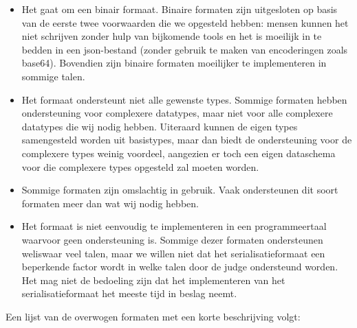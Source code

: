 \begin{itemize}
    \item Het gaat om een binair formaat.
    Binaire formaten zijn uitgesloten op basis van de eerste twee voorwaarden die we opgesteld hebben: mensen kunnen het niet schrijven zonder hulp van bijkomende tools en het is moeilijk in te bedden in een json-bestand (zonder gebruik te maken van encoderingen zoals base64).
    Bovendien zijn binaire formaten moeilijker te implementeren in sommige talen.
    \item Het formaat ondersteunt niet alle gewenste types.
    Sommige formaten hebben ondersteuning voor complexere datatypes, maar niet voor alle complexere datatypes die wij nodig hebben.
    Uiteraard kunnen de eigen types samengesteld worden uit basistypes, maar dan biedt de ondersteuning voor de complexere types weinig voordeel, aangezien er toch een eigen dataschema voor die complexere types opgesteld zal moeten worden.
    \item Sommige formaten zijn omslachtig in gebruik.
    Vaak ondersteunen dit soort formaten meer dan wat wij nodig hebben.
    \item Het formaat is niet eenvoudig te implementeren in een programmeertaal waarvoor geen ondersteuning is.
    Sommige dezer formaten ondersteunen weliswaar veel talen, maar we willen niet dat het serialisatieformaat een beperkende factor wordt in welke talen door de judge ondersteund worden.
    Het mag niet de bedoeling zijn dat het implementeren van het serialisatieformaat het meeste tijd in beslag neemt.
\end{itemize}

Een lijst van de overwogen formaten met een korte beschrijving volgt:

